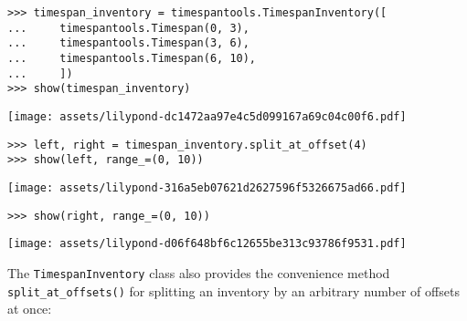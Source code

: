 \begin{singlespacing}
\vspace{-0.5\baselineskip}
\begin{lstlisting}
>>> timespan_inventory = timespantools.TimespanInventory([
...     timespantools.Timespan(0, 3),
...     timespantools.Timespan(3, 6),
...     timespantools.Timespan(6, 10),
...     ])
>>> show(timespan_inventory)
\end{lstlisting}
\noindent\texttt{[image: assets/lilypond-dc1472aa97e4c5d099167a69c04c00f6.pdf]}
\begin{lstlisting}
>>> left, right = timespan_inventory.split_at_offset(4)
>>> show(left, range_=(0, 10))
\end{lstlisting}
\noindent\texttt{[image: assets/lilypond-316a5eb07621d2627596f5326675ad66.pdf]}
\begin{lstlisting}
>>> show(right, range_=(0, 10))
\end{lstlisting}
\noindent\texttt{[image: assets/lilypond-d06f648bf6c12655be313c93786f9531.pdf]}
\end{singlespacing}

\noindent The \texttt{TimespanInventory} class also provides the convenience
method \texttt{split\_at\_offsets()} for splitting an inventory by an arbitrary
number of offsets at once:

\begin{comment}
<abjad>
timespan_inventory = timespantools.TimespanInventory([
    timespantools.Timespan(0, 3),
    timespantools.Timespan(3, 6),
    timespantools.Timespan(6, 10),
    ])
show(timespan_inventory)
shards = timespan_inventory.split_at_offsets((2, 4, 7))
for shard in shards:
    show(shard, range_=(0, 10))

</abjad>
\end{comment}


